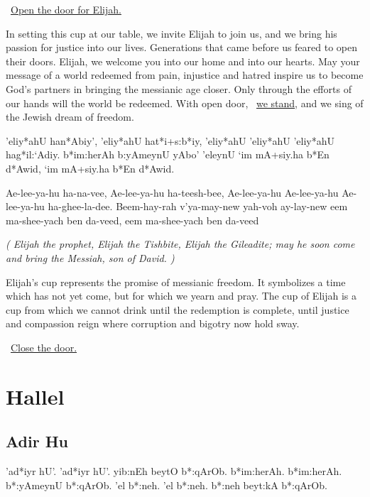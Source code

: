 \documentclass[12pt]{article}
\newenvironment{hebrewPrayer}
    {\begin{cjhebrew}
     \Large
    }
    { 
    \end{cjhebrew}
    }
\newenvironment{hebrewTransliteration}{}{\par}
\newenvironment{unreadHebrewTranslation}{\itshape(\hspace{-0.2em}}{\hspace{-0.2em})\par}
\newcommand{\god}{God}
\newcommand{\hebrewVowelOh}{\textrm{\hspace{0.2em}}o\textrm{\hspace{-0.2em}}}
\newcommand{\inlineSederAction}[1]{\faHandORight{}~\underline{#1}}
\newcommand{\sederAction}[1]{\inlineSederAction{#1}\par}
\newcommand{\sederSection}[2]{
    \section*{#1 \Huge\cjRL{#2}}
}
\begin{document}
\sederAction{Open the door for Elijah.}

In setting this cup at our table, we invite Elijah to join us, and we bring his passion for justice into our lives. Generations that came before us feared to open their doors. Elijah, we welcome you into our home and into our hearts. May your message of a world redeemed from pain, injustice and hatred inspire us to become {\god}'s partners in bringing the messianic age closer. Only through the efforts of our hands will the world be redeemed. With open door, \inlineSederAction{we stand}, and we sing of the Jewish dream of freedom.

\begin{hebrewPrayer}
    'eliy*ahU han*Abiy'\textrm{,} 'eliy*ahU hat*i+s:b*iy\textrm{,} 'eliy*ahU 'eliy*ahU 'eliy*ahU hag*il:`Adiy\textrm{.} b*im:herAh b:yAmeynU \hbox{yAb{\hebrewVowelOh}'} 'eleynU `im mA+siy.ha b*En d*Awid\textrm{,} `im mA+siy.ha b*En d*Awid\textrm{.}
\end{hebrewPrayer}

\begin{hebrewTransliteration}
    Ae-lee-ya-hu ha-na-vee, Ae-lee-ya-hu ha-teesh-bee, Ae-lee-ya-hu Ae-lee-ya-hu Ae-lee-ya-hu ha-ghee-la-dee. Beem-hay-rah v'ya-may-new yah-voh ay-lay-new eem ma-shee-yach ben da-veed, eem ma-shee-yach ben da-veed
\end{hebrewTransliteration}

\begin{unreadHebrewTranslation}
    Elijah the prophet, Elijah the Tishbite, Elijah the Gileadite; may he soon come and bring the Messiah, son of David.
\end{unreadHebrewTranslation}

Elijah's cup represents the promise of messianic freedom. It symbolizes a time which has not yet come, but for which we yearn and pray. The cup of Elijah is a cup from which we cannot drink until the redemption is complete, until justice and compassion reign where corruption and bigotry now hold sway.

\sederAction{Close the door.}



\sederSection{Hallel}{hal*el}

\subsection*{Adir Hu}

\begin{hebrewPrayer}
    'ad*iyr hU'\textrm{.} 'ad*iyr hU'\textrm{.} yib:nEh beytO b*:qArOb\textrm{.} b*im:herAh\textrm{.} b*im:herAh\textrm{.} b*:yAmeynU b*:qArOb\textrm{.} 'el b*:neh\textrm{.} 'el b*:neh\textrm{.} b*:neh beyt:kA b*:qArOb\textrm{.}
\end{hebrewPrayer}
\end{document}
